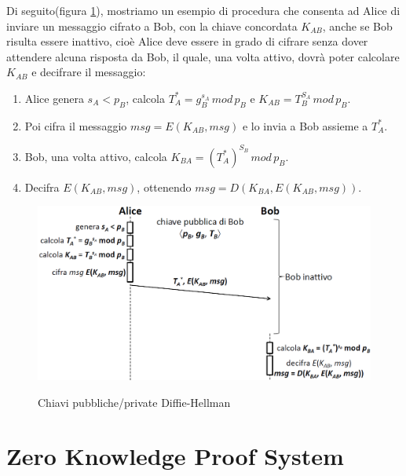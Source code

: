 Di seguito(figura \ref{fig:authex}), mostriamo un esempio di procedura che consenta ad Alice di inviare un messaggio cifrato a Bob, con la chiave concordata $K_{AB}$, anche se Bob risulta essere inattivo, cioè Alice deve essere in grado di cifrare senza dover attendere alcuna risposta da Bob, il quale, una volta attivo, dovrà poter calcolare $K_{AB}$ e decifrare il messaggio:
\begin{enumerate}
\item Alice genera $s_{A}<p_{B}$, calcola $T_{A}^{*}=g_{B}^{s_{A}} \, mod \, p_{B}$ e $K_{AB}=T_{B}^{S_{A}} \, mod \, p_{B}$.
\item Poi cifra il messaggio $msg=E(K_{AB},msg)$ e lo invia a Bob assieme a $T_{A}^{*}$.
\item Bob, una volta attivo, calcola  $K_{BA}=(T_{A}^*)^{S_{B}} \, mod \, p_{B}$.
\item Decifra $E(K_{AB},msg)$, ottenendo $msg=D(K_{BA},E(K_{AB},msg))$.
\end{enumerate}
\begin{figure}[htbp]
	\centering%
	\subfigure%
	{\includegraphics[scale=0.6, keepaspectratio]{Immagini/chiave_pubblica/DiffieHellman_pubseckey.png}}
	\caption{Chiavi pubbliche/private Diffie-Hellman}
	\label{fig:authex}
\end{figure} 

\section{Zero Knowledge Proof System}

